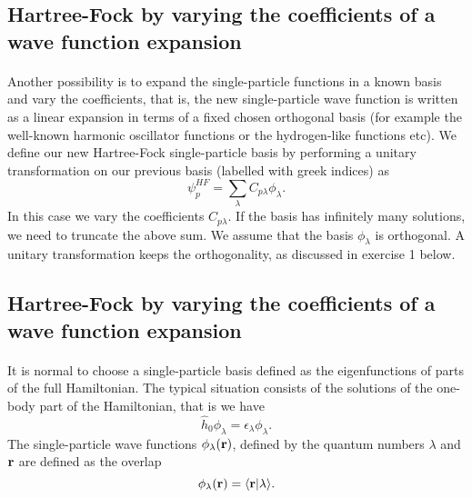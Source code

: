 \documentclass[%
twoside,                 %
final,                   %
10pt]{article}
\begin{document}
\subsection*{Hartree-Fock by varying the coefficients of a wave function expansion}

\paragraph{}
Another possibility is to expand the single-particle functions in a known basis  and vary the coefficients, 
that is, the new single-particle wave function is written as a linear expansion
in terms of a fixed chosen orthogonal basis (for example the well-known harmonic oscillator functions or the hydrogen-like functions etc).
We define our new Hartree-Fock single-particle basis by performing a unitary transformation 
on our previous basis (labelled with greek indices) as
\begin{equation}
\psi_p^{HF}  = \sum_{\lambda} C_{p\lambda}\phi_{\lambda}. \label{eq:newbasis}
\end{equation}
In this case we vary the coefficients $C_{p\lambda}$. If the basis has infinitely many solutions, we need
to truncate the above sum.  We assume that the basis $\phi_{\lambda}$ is orthogonal. A unitary transformation keeps the orthogonality, as discussed in exercise 1 below.



\subsection*{Hartree-Fock by varying the coefficients of a wave function expansion}

\paragraph{}
It is normal to choose a single-particle basis defined as the eigenfunctions
of parts of the full Hamiltonian. The typical situation consists of the solutions of the one-body part of the Hamiltonian, that is we have
\[
\hat{h}_0\phi_{\lambda}=\epsilon_{\lambda}\phi_{\lambda}.
\]
The single-particle wave functions $\phi_{\lambda}({\bf r})$, defined by the quantum numbers $\lambda$ and ${\bf r}$
are defined as the overlap 
\[
   \phi_{\lambda}({\bf r})  = \langle {\bf r} | \lambda \rangle .
\]
\end{document}
